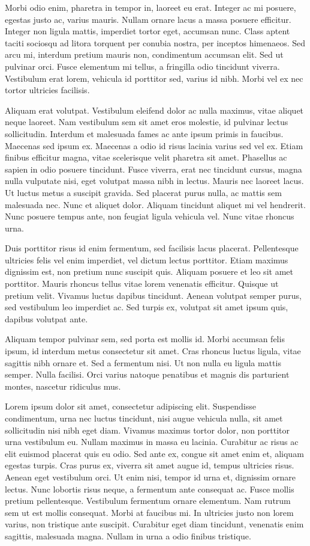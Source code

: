 \documentclass[twocolumn]{article}
\begin{document}
	Morbi odio enim, pharetra in tempor in, laoreet eu erat. Integer ac mi posuere, egestas justo ac, varius mauris. Nullam ornare lacus a massa posuere efficitur. Integer non ligula mattis, imperdiet tortor eget, accumsan nunc. Class aptent taciti sociosqu ad litora torquent per conubia nostra, per inceptos himenaeos. Sed arcu mi, interdum pretium mauris non, condimentum accumsan elit. Sed ut pulvinar orci. Fusce elementum mi tellus, a fringilla odio tincidunt viverra. Vestibulum erat lorem, vehicula id porttitor sed, varius id nibh. Morbi vel ex nec tortor ultricies facilisis.
	
	Aliquam erat volutpat. Vestibulum eleifend dolor ac nulla maximus, vitae aliquet neque laoreet. Nam vestibulum sem sit amet eros molestie, id pulvinar lectus sollicitudin. Interdum et malesuada fames ac ante ipsum primis in faucibus. Maecenas sed ipsum ex. Maecenas a odio id risus lacinia varius sed vel ex. Etiam finibus efficitur magna, vitae scelerisque velit pharetra sit amet. Phasellus ac sapien in odio posuere tincidunt. Fusce viverra, erat nec tincidunt cursus, magna nulla vulputate nisi, eget volutpat massa nibh in lectus. Mauris nec laoreet lacus. Ut luctus metus a suscipit gravida. Sed placerat purus nulla, ac mattis sem malesuada nec. Nunc et aliquet dolor. Aliquam tincidunt aliquet mi vel hendrerit. Nunc posuere tempus ante, non feugiat ligula vehicula vel. Nunc vitae rhoncus urna.
	
	Duis porttitor risus id enim fermentum, sed facilisis lacus placerat. Pellentesque ultricies felis vel enim imperdiet, vel dictum lectus porttitor. Etiam maximus dignissim est, non pretium nunc suscipit quis. Aliquam posuere et leo sit amet porttitor. Mauris rhoncus tellus vitae lorem venenatis efficitur. Quisque ut pretium velit. Vivamus luctus dapibus tincidunt. Aenean volutpat semper purus, sed vestibulum leo imperdiet ac. Sed turpis ex, volutpat sit amet ipsum quis, dapibus volutpat ante.
	
	Aliquam tempor pulvinar sem, sed porta est mollis id. Morbi accumsan felis ipsum, id interdum metus consectetur sit amet. Cras rhoncus luctus ligula, vitae sagittis nibh ornare et. Sed a fermentum nisi. Ut non nulla eu ligula mattis semper. Nulla facilisi. Orci varius natoque penatibus et magnis dis parturient montes, nascetur ridiculus mus.
	
	
	Lorem ipsum dolor sit amet, consectetur adipiscing elit. Suspendisse condimentum, urna nec luctus tincidunt, nisi augue vehicula nulla, sit amet sollicitudin nisi nibh eget diam. Vivamus maximus tortor dolor, non porttitor urna vestibulum eu. Nullam maximus in massa eu lacinia. Curabitur ac risus ac elit euismod placerat quis eu odio. Sed ante ex, congue sit amet enim et, aliquam egestas turpis. Cras purus ex, viverra sit amet augue id, tempus ultricies risus. Aenean eget vestibulum orci. Ut enim nisi, tempor id urna et, dignissim ornare lectus. Nunc lobortis risus neque, a fermentum ante consequat ac. Fusce mollis pretium pellentesque. Vestibulum fermentum ornare elementum. Nam rutrum sem ut est mollis consequat. Morbi at faucibus mi. In ultricies justo non lorem varius, non tristique ante suscipit. Curabitur eget diam tincidunt, venenatis enim sagittis, malesuada magna. Nullam in urna a odio finibus tristique.
	
\end{document}
